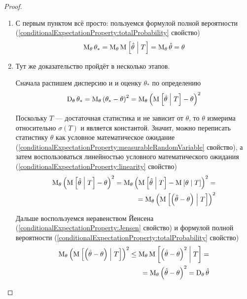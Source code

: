 \begin{proof}
    \begin{enumerate}
        \item С первым пунктом всё просто:
            пользуемся формулой полной вероятности
            (\ref{conditionalExpectationProperty:totalProbability} свойство)
            $$\operatorname{M}_{\theta} \theta_*
                = \operatorname{M}_{\theta} \operatorname{M}_{} \left[ \hat{\theta} \;\middle|\; T \right]
                = \operatorname{M}_{\theta} \hat{\theta}
                = \theta$$
        \item Тут же доказательство пройдёт в несколько этапов.

            Сначала распишем дисперсию и и оценку $\theta_*$ по определению
            $$\operatorname{D}_{\theta} \theta_*
                = \operatorname{M}_{\theta} \left( \theta_* - \theta \right)^2
                = \operatorname{M}_{\theta} \left( \operatorname{M}_{} \left[ \hat{\theta} \;\middle|\; T \right]
                    - \theta \right)^2$$

            Поскольку $T$ --- достаточная статистика и не зависит от $\theta$,
            то $\theta$ измерима относительно $\sigma\left( T \right)$
            и является константой. Значит, можно переписать
            статистику $\theta$ как условное математическое ожидание
            (\ref{conditionalExpectationProperty:measurableRandomVariable}
            свойство), а затем воспользоваться линейностью
            условного математического ожидания
            (\ref{conditionalExpectationProperty:linearity} свойство)
            \begin{align*}
                \operatorname{M}_{\theta} \left( \operatorname{M}_{} \left[ \hat{\theta} \;\middle|\; T \right]
                        - \theta \right)^2
                    = \operatorname{M}_{\theta} \left( \operatorname{M}_{} \left[ \hat{\theta} \;\middle|\; T \right]
                        - \operatorname{M}_{} \left[ \theta \;\middle|\; T \right] \right)^2 = \\
                    = \operatorname{M}_{\theta} \left(
                        \operatorname{M}_{} \left[ \left( \hat{\theta} - \theta \right) \;\middle|\; T \right]
                        \right)^2
            \end{align*}

            Дальше воспользуемся неравенством Йенсена
            (\ref{conditionalExpectationProperty:Jensen} свойство)
            и формулой полной вероятности
            (\ref{conditionalExpectationProperty:totalProbability} свойство)
            \begin{align*}
                \operatorname{M}_{\theta} \left( \operatorname{M}_{} \left[ \left( \hat{\theta}
                        - \theta \right) \;\middle|\; T \right]\right)^2
                    \le \operatorname{M}_{\theta} \operatorname{M}_{} \left[ \left( \hat{\theta}
                        - \theta \right)^2 \;\middle|\; T \right] = \\
                    = \operatorname{M}_{\theta} \left( \hat{\theta} -\theta \right)^2
                    = \operatorname{D}_{\theta} \hat{\theta}
            \end{align*}
    \end{enumerate}
\end{proof}

